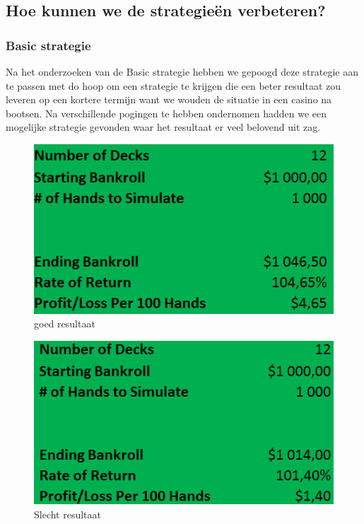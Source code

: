 \documentclass[conference]{IEEEtran}
\begin{document}
\subsection{Hoe kunnen we de strategie\"{e}n verbeteren?}
\subsubsection{Basic strategie}
Na het onderzoeken van de Basic strategie hebben we gepoogd deze strategie aan te passen met do hoop om een strategie te krijgen die een beter resultaat zou leveren op een kortere termijn want we wouden de situatie in een casino na bootsen. Na verschillende pogingen te hebben ondernomen hadden we een mogelijke strategie gevonden waar het resultaat er veel belovend uit zag. 
\begin{figure}[hb]
    \centering
    \includegraphics[scale=0.37]{BasicAAngepastGoedResultaat.png}
    \caption{goed resultaat}
\end{figure}

\begin{figure}[hb]
    \centering
    \includegraphics[scale=0.37]{BasicAangepastSlechtsteResultaat.png}
    \caption{Slecht resultaat}
\end{figure}
\end{document}
